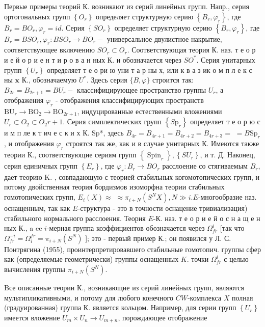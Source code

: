 \documentclass[10pt]{article}
\begin{document}
Первые примеры теорий $К$. возникают из серий линейных групп. Напр., серия ортогональных групп $\left\{O_{r}\right\}$ определяет структурную серию $\left\{B_{r}, \varphi_{r}\right\}$, где $B_{r}=B O_{r}, \varphi_{r}=i d$. Серия $\left\{S O_{r}\right\}$ определяет структурную серию $\left\{B_{r}, \varphi_{r}\right\}$, где $B_{r}=B S O_{r}, \varphi_{r}: B S O_{r} \rightarrow B O_{r}-$ универсальное двулистное накрытие, соответствующее включению $S O_{r} \subset O_{r}$. Соответствующая теория К. наз. т е о р и е й о р и е н т и р о в а н ных К. и обозначается через $S O^{*}$. Серия унитарных групп $\left\{U_{r}\right\}$ определяет т е о ри ю уни т а р ны х, или к в а з ик о м п л е к с ны $\mathbf{x}$ К., обозначаемую $U^{*}$. Здесь серия $\{B, \varphi\}$ строится так: $B_{2 r}=B_{2 r+1}=B U_{r}-$ классифицирующее пространство группы $U_{r}$, а отображения $\varphi_{r}$ - отображения классифицирующих пространств $\mathrm{BU}_{r} \rightarrow \mathrm{BO}_{2} \rightarrow \mathrm{BO}_{2 r+1}$, индуцированные естественными вложениями $U_{r} \subset O_{2} \subset O_{2} r+1$. Серия симплектических групп $\left\{S \mathrm{p}_{r}\right\}$ определяет т е о р ю с и м п ле к т ич е с к и х К. Sp*, здесь $B_{4 r}=B_{4 r+1}=B_{4 r+2}=B_{4 r+3}=$ $=B \mathrm{Sp}_{r}$, и отображения $\varphi_{r}$ строятся так же, как и в случае унитарных К. Имеются также теории К., соответствующие сериям групп $\left\{\operatorname{Spin}_{r}\right\},\left\{S U_{r}\right\}$, и т. Д. Наконец, серия единичных групп $\left\{E_{r}\right\}$, где $\varphi_{r}: B_{r} \rightarrow B O_{r}$ расслоение со стягиваемым $B_{r}$, дает теорию $\mathrm{K}$. , совпадающую с теорией стабильных когомотопических групп, и потому двойственная теория бордизмов изоморфна теории стабильных гомотопических групп, $E_{i}(X) \approx$ $\approx \pi_{i+N}\left(S^{N} X\right), N \gg i . E$-многообразие наз. оснащенным, так как $E$-структура - это в точности оснацение тривиализация) стабильного нормального расслоения. Теория $E$-К. наз. т е о р и е й о с н а щ е н ных К., a ee $i$-мерная группа коэффициентов обозначается через $\Omega_{f r}^{i}$ [так что $\Omega_{f r}^{-i}=\Omega_{i}^{f r}=\pi_{i+N}\left(S^{N}\right)$ ]; это - первый пример К.; он появился у Л. С. Понтрягина (1955), проинтерпретировавшего стабильные гомотопич. группы сфер как (определяемые геометрически) группы оснащенных $K$. точки $\Omega_{f r}^{i}$ с целью вычисления группы $\pi_{i+N}\left(S^{N}\right)$.



Bсе описанные теории К., возникающие из серий линейных групп, являются мультипликативными, и потому для любого конечного $C W$-комплекса $X$ полная (градуированная) группа К. является кольцом. Например, для серии групп $\left\{U_{r}\right\}$ имеется вложение $U_{m} \times U_{n} \rightarrow U_{m+n}$, порождающее отображение
\end{document}
